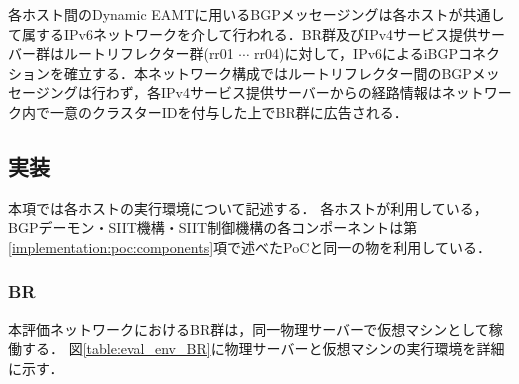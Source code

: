 各ホスト間のDynamic EAMTに用いるBGPメッセージングは各ホストが共通して属するIPv6ネットワークを介して行われる．BR群及びIPv4サービス提供サーバー群はルートリフレクター群(rr01 $\cdots$ rr04)に対して，IPv6によるiBGPコネクションを確立する．本ネットワーク構成ではルートリフレクター間のBGPメッセージングは行わず，各IPv4サービス提供サーバーからの経路情報はネットワーク内で一意のクラスターIDを付与した上でBR群に広告される．

\subsection{実装}
本項では各ホストの実行環境について記述する．
各ホストが利用している，BGPデーモン・SIIT機構・SIIT制御機構の各コンポーネントは第\ref{implementation:poc:components}項で述べたPoCと同一の物を利用している．


\subsubsection{BR}
本評価ネットワークにおけるBR群は，同一物理サーバーで仮想マシンとして稼働する．
図\ref{table:eval_env_BR}に物理サーバーと仮想マシンの実行環境を詳細に示す．


\begin{table}[h]
    \label{table:eval_env_BR}
    \caption{評価実験用BR群の実行環境}
\end{table}

